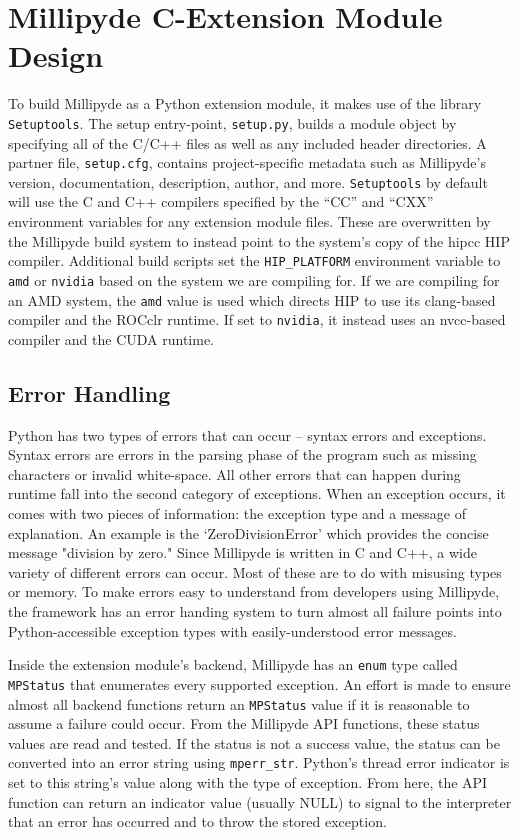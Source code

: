 \section{Millipyde C-Extension Module Design}

To build Millipyde as a Python extension module, it makes use of the library \verb|Setuptools|. The setup entry-point, \verb|setup.py|, builds a module object by specifying all of the C/C++ files as well as any included header directories. A partner file, \verb|setup.cfg|, contains project-specific metadata such as Millipyde's version, documentation, description, author, and more. \verb|Setuptools| by default will use the C and C++ compilers specified by the ``CC'' and ``CXX'' environment variables for any extension module files. These are overwritten by the Millipyde build system to instead point to the system's copy of the hipcc HIP compiler. Additional build scripts set the \verb|HIP_PLATFORM| environment variable to \verb|amd| or \verb|nvidia| based on the system we are compiling for. If we are compiling for an AMD system, the \verb|amd| value is used which directs HIP to use its clang-based compiler and the ROCclr runtime. If set to \verb|nvidia|, it instead uses an nvcc-based compiler and the CUDA runtime. 

\subsection{Error Handling}

Python has two types of errors that can occur -- syntax errors and exceptions. Syntax errors are errors in the parsing phase of the program such as missing characters or invalid white-space. All other errors that can happen during runtime fall into the second category of exceptions. When an exception occurs, it comes with two pieces of information: the exception type and a message of explanation. An example is the `ZeroDivisionError' which provides the concise message "division by zero." Since Millipyde is written in C and C++, a wide variety of different errors can occur. Most of these are to do with misusing types or memory. To make errors easy to understand from developers using Millipyde, the framework has an error handing system to turn almost all failure points into Python-accessible exception types with easily-understood error messages.

\quad Inside the extension module's backend, Millipyde has an \verb|enum| type called \verb|MPStatus| that enumerates every supported exception. An effort is made to ensure almost all backend functions return an \verb|MPStatus| value if it is reasonable to assume a failure could occur. From the Millipyde API functions, these status values are read and tested. If the status is not a success value, the status can be converted into an error string using \verb|mperr_str|. Python's thread error indicator is set to this string's value along with the type of exception. From here, the API function can return an indicator value (usually NULL) to signal to the interpreter that an error has occurred and to throw the stored exception.

